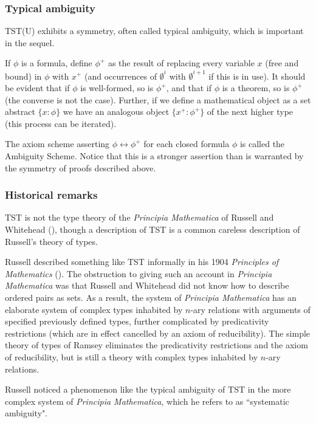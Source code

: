 \documentclass{article}
\theoremstyle{definition}
\theoremstyle{remark}
\begin{document}
{\subsubsection{Typical ambiguity}

TST(U) exhibits a symmetry, often called typical ambiguity, which is important in the sequel.



If $\phi$ is a formula, define $\phi^+$ as the result of replacing every variable $x$ (free and bound) in $\phi$ with $x^+$ (and occurrences of $\emptyset^i$ with $\emptyset^{i+1}$ if this is in use).   It should be evident that if $\phi$ is well-formed, so is $\phi^+$,
and that if $\phi$ is a theorem, so is $\phi^+$ (the converse is not the case).  Further, if we define a mathematical object as a set abstract $\{x:\phi\}$ we have an analogous
object $\{x^+:\phi^+\}$ of the next higher type (this process can be iterated).

The axiom scheme asserting $\phi \leftrightarrow \phi^+$ for each closed formula $\phi$ is called the Ambiguity Scheme.   Notice that this is a stronger assertion than is warranted by the symmetry of proofs described above.

\subsubsection{Historical remarks}

TST is not the type theory of the {\em Principia Mathematica\/} of Russell and Whitehead (\cite{pm}), though a description of TST is a common careless description of Russell's theory of types.

Russell described something like TST informally in his 1904 {\em Principles of Mathematics\/} (\cite{pm1}).  The obstruction to giving such an account in {\em Principia Mathematica\/} was that
Russell and Whitehead did not know how to describe ordered pairs as sets.  As a result, the system of {\em Principia Mathematica\/} has an elaborate system of  complex
types inhabited by $n$-ary relations with arguments of specified previously defined types, further complicated by predicativity restrictions (which are in effect cancelled by an axiom of reducibility).
The simple theory of types of Ramsey eliminates the predicativity restrictions and the axiom of reducibility, but is still a theory with complex types inhabited by $n$-ary relations.

Russell noticed a phenomenon like the typical ambiguity of TST in the more complex system of {\em Principia Mathematica\/}, which he refers to as ``systematic ambiguity".

}
\end{document}

